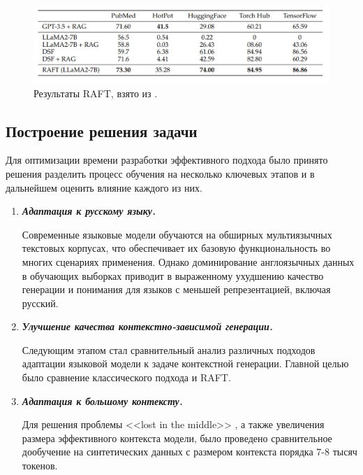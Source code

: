 \begin{figure}[h!]
    \centering
    \includegraphics[scale=0.42]{images/raft_result.png}
    \caption{Результаты RAFT, взято из \cite{raft}.}
\end{figure}

\subsection{Построение решения задачи}
\label{sec:Solution} 

Для оптимизации времени разработки эффективного подхода было принято решения разделить процесс обучения на несколько ключевых этапов и в дальнейшем оценить влияние каждого из них.

\begin{enumerate}

  \item \textbf{\textit{Адаптация к русскому языку.}}

    Современные языковые модели обучаются на обширных мультиязычных текстовых корпусах, что обеспечивает их базовую функциональность во многих сценариях применения. Однако доминирование англоязычных данных в обучающих выборках приводит в выраженному ухудшению качество генерации и понимания для языков с меньшей репрезентацией, включая русский.
  
 \item \textit{\textbf{Улучшение качества контекстно-зависимой генерации.}}
  
    Следующим этапом стал сравнительный анализ различных подходов адаптации языковой модели к задаче контекстной генерации. Главной целью было сравнение классического подхода и RAFT. 
  
  \item \textit{\textbf{Адаптация к большому контексту.}}
  
    Для решения проблемы <<lost in the middle>> \cite{lost_in_the_middle}, а также увеличения размера эффективного контекста модели, было проведено сравнительное дообучение на синтетических данных с размером контекста порядка 7-8 тысяч токенов.
  
\end{enumerate}

\newpage
